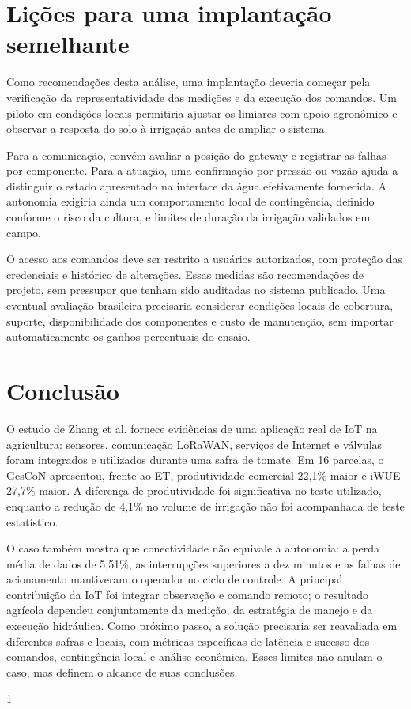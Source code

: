 \documentclass[11pt,a4paper]{article}
\begin{document}
\section{Lições para uma implantação semelhante}
Como recomendações desta análise, uma implantação deveria começar pela verificação da representatividade das medições e da execução dos comandos. Um piloto em condições locais permitiria ajustar os limiares com apoio agronômico e observar a resposta do solo à irrigação antes de ampliar o sistema.

Para a comunicação, convém avaliar a posição do gateway e registrar as falhas por componente. Para a atuação, uma confirmação por pressão ou vazão ajuda a distinguir o estado apresentado na interface da água efetivamente fornecida. A autonomia exigiria ainda um comportamento local de contingência, definido conforme o risco da cultura, e limites de duração da irrigação validados em campo.

O acesso aos comandos deve ser restrito a usuários autorizados, com proteção das credenciais e histórico de alterações. Essas medidas são recomendações de projeto, sem pressupor que tenham sido auditadas no sistema publicado. Uma eventual avaliação brasileira precisaria considerar condições locais de cobertura, suporte, disponibilidade dos componentes e custo de manutenção, sem importar automaticamente os ganhos percentuais do ensaio.

\section{Conclusão}
O estudo de Zhang et al. fornece evidências de uma aplicação real de IoT na agricultura: sensores, comunicação LoRaWAN, serviços de Internet e válvulas foram integrados e utilizados durante uma safra de tomate. Em 16 parcelas, o GesCoN apresentou, frente ao ET, produtividade comercial 22,1\% maior e iWUE 27,7\% maior. A diferença de produtividade foi significativa no teste utilizado, enquanto a redução de 4,1\% no volume de irrigação não foi acompanhada de teste estatístico.

O caso também mostra que conectividade não equivale a autonomia: a perda média de dados de 5,51\%, as interrupções superiores a dez minutos e as falhas de acionamento mantiveram o operador no ciclo de controle. A principal contribuição da IoT foi integrar observação e comando remoto; o resultado agrícola dependeu conjuntamente da medição, da estratégia de manejo e da execução hidráulica. Como próximo passo, a solução precisaria ser reavaliada em diferentes safras e locais, com métricas específicas de latência e sucesso dos comandos, contingência local e análise econômica. Esses limites não anulam o caso, mas definem o alcance de suas conclusões.

\begin{spacing}{1}
\footnotesize


\end{spacing}
\end{document}
